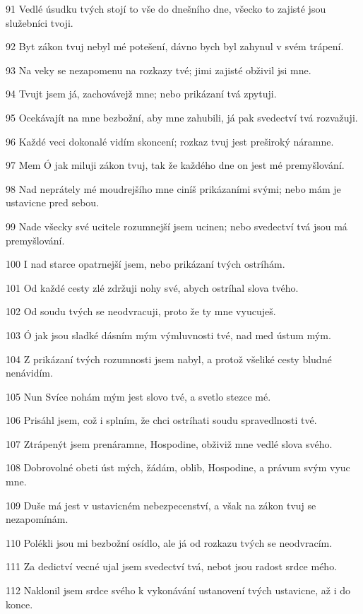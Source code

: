 \par 91 Vedlé úsudku tvých stojí to vše do dnešního dne, všecko to zajisté jsou služebníci tvoji.
\par 92 Byt zákon tvuj nebyl mé potešení, dávno bych byl zahynul v svém trápení.
\par 93 Na veky se nezapomenu na rozkazy tvé; jimi zajisté obživil jsi mne.
\par 94 Tvujt jsem já, zachovávejž mne; nebo prikázaní tvá zpytuji.
\par 95 Ocekávajít na mne bezbožní, aby mne zahubili, já pak svedectví tvá rozvažuji.
\par 96 Každé veci dokonalé vidím skoncení; rozkaz tvuj jest preširoký náramne.
\par 97 Mem Ó jak miluji zákon tvuj, tak že každého dne on jest mé premyšlování.
\par 98 Nad neprátely mé moudrejšího mne ciníš prikázaními svými; nebo mám je ustavicne pred sebou.
\par 99 Nade všecky své ucitele rozumnejší jsem ucinen; nebo svedectví tvá jsou má premyšlování.
\par 100 I nad starce opatrnejší jsem, nebo prikázaní tvých ostríhám.
\par 101 Od každé cesty zlé zdržuji nohy své, abych ostríhal slova tvého.
\par 102 Od soudu tvých se neodvracuji, proto že ty mne vyucuješ.
\par 103 Ó jak jsou sladké dásním mým výmluvnosti tvé, nad med ústum mým.
\par 104 Z prikázaní tvých rozumnosti jsem nabyl, a protož všeliké cesty bludné nenávidím.
\par 105 Nun Svíce nohám mým jest slovo tvé, a svetlo stezce mé.
\par 106 Prisáhl jsem, což i splním, že chci ostríhati soudu spravedlnosti tvé.
\par 107 Ztrápenýt jsem prenáramne, Hospodine, obživiž mne vedlé slova svého.
\par 108 Dobrovolné obeti úst mých, žádám, oblib, Hospodine, a právum svým vyuc mne.
\par 109 Duše má jest v ustavicném nebezpecenství, a však na zákon tvuj se nezapomínám.
\par 110 Polékli jsou mi bezbožní osídlo, ale já od rozkazu tvých se neodvracím.
\par 111 Za dedictví vecné ujal jsem svedectví tvá, nebot jsou radost srdce mého.
\par 112 Naklonil jsem srdce svého k vykonávání ustanovení tvých ustavicne, až i do konce.

